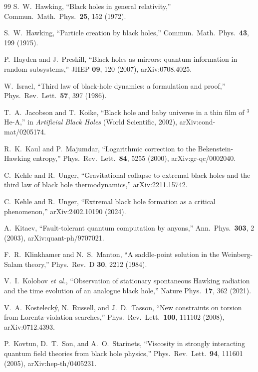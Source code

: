 \documentclass[aps,prd,reprint,nofootinbib,superscriptaddress]{revtex4-2}
\begin{document}
\begin{thebibliography}{99}
S.~W.~Hawking,
``Black holes in general relativity,''
Commun.\ Math.\ Phys.\ \textbf{25}, 152 (1972).

S.~W.~Hawking,
``Particle creation by black holes,''
Commun.\ Math.\ Phys.\ \textbf{43}, 199 (1975).

P.~Hayden and J.~Preskill,
``Black holes as mirrors: quantum information in random subsystems,''
JHEP \textbf{09}, 120 (2007),
arXiv:0708.4025.

W.~Israel,
``Third law of black-hole dynamics: a formulation and proof,''
Phys.\ Rev.\ Lett.\ \textbf{57}, 397 (1986).

T.~A.~Jacobson and T.~Koike,
``Black hole and baby universe in a thin film of $^3$He-A,''
in \emph{Artificial Black Holes} (World Scientific, 2002),
arXiv:cond-mat/0205174.

R.~K.~Kaul and P.~Majumdar,
``Logarithmic correction to the Bekenstein-Hawking entropy,''
Phys.\ Rev.\ Lett.\ \textbf{84}, 5255 (2000),
arXiv:gr-qc/0002040.

C.~Kehle and R.~Unger,
``Gravitational collapse to extremal black holes and the third law of
black hole thermodynamics,''
arXiv:2211.15742.

C.~Kehle and R.~Unger,
``Extremal black hole formation as a critical phenomenon,''
arXiv:2402.10190 (2024).

A.~Kitaev,
``Fault-tolerant quantum computation by anyons,''
Ann.\ Phys.\ \textbf{303}, 2 (2003),
arXiv:quant-ph/9707021.

F.~R.~Klinkhamer and N.~S.~Manton,
``A saddle-point solution in the Weinberg-Salam theory,''
Phys.\ Rev.\ D \textbf{30}, 2212 (1984).

V.~I.~Kolobov \emph{et al.},
``Observation of stationary spontaneous Hawking radiation and the
time evolution of an analogue black hole,''
Nature Phys.\ \textbf{17}, 362 (2021).

V.~A.~Kosteleck\'y, N.~Russell, and J.~D.~Tasson,
``New constraints on torsion from Lorentz-violation searches,''
Phys.\ Rev.\ Lett.\ \textbf{100}, 111102 (2008),
arXiv:0712.4393.

P.~Kovtun, D.~T.~Son, and A.~O.~Starinets,
``Viscosity in strongly interacting quantum field theories from black hole
physics,''
Phys.\ Rev.\ Lett.\ \textbf{94}, 111601 (2005),
arXiv:hep-th/0405231.


\end{thebibliography}
\end{document}
